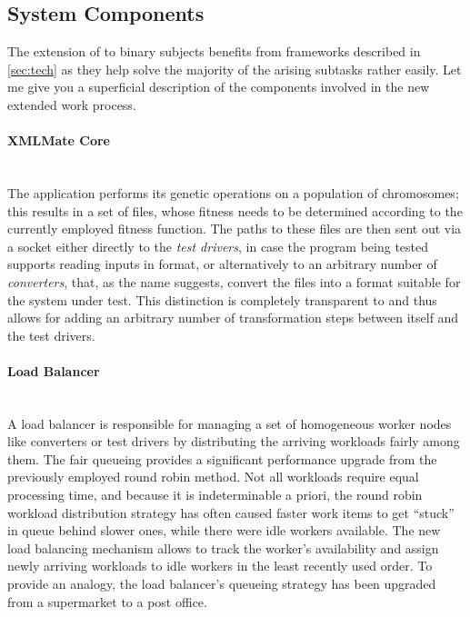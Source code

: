 \subsection{System Components}
\label{sec:components}
The extension of \xmlmate to binary subjects benefits from frameworks described in \cref{sec:tech} as they 
help solve the majority of the arising subtasks rather easily. Let me give you a superficial description
of the components involved in the new extended \xmlmate work process.
\paragraph{XMLMate Core} ~\\
  The \java application \xmlmate performs its genetic operations on a population of chromosomes; this 
  results in a set of \xml files, whose fitness needs to be determined according to the currently employed
  fitness function. The paths to these files are then sent out via a \zmq socket either directly to the
  \emph{test drivers}, in case the program being tested supports reading inputs in \xml format, or alternatively 
  to an arbitrary number of \emph{converters}, that, as the name suggests, convert the \xml files into a format 
  suitable for the system under test. This distinction is completely transparent to \xmlmate and thus allows for 
  adding an arbitrary number of transformation steps between itself and the test drivers.
  \paragraph{Load Balancer} ~\\
  A load balancer is responsible for managing a set of homogeneous worker nodes like converters or test
  drivers by distributing the arriving workloads fairly among them. The fair queueing provides a significant
  performance upgrade from the previously employed round robin method. Not all workloads require equal
  processing time, and because it is indeterminable a priori, the round robin workload distribution strategy
  has often caused faster work items to get ``stuck'' in queue behind slower ones, while there were idle
  workers available. The new load balancing mechanism allows to track the worker's availability and assign
  newly arriving workloads to idle workers in the least recently used order. To provide an analogy, the load
  balancer's queueing strategy has been upgraded from a supermarket to a post office. 
  

